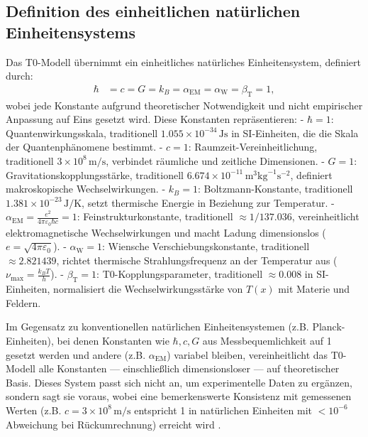 \documentclass[12pt,a4paper]{article}
\newcommand{\Tfield}{T(x)}
\newcommand{\alphaEM}{\alpha_{\text{EM}}}
\newcommand{\alphaW}{\alpha_{\text{W}}}
\newcommand{\betaT}{\beta_{\text{T}}}
\begin{document}
	\subsection{Definition des einheitlichen natürlichen Einheitensystems}
	\label{subsec:unified_system}
	
	Das T0-Modell übernimmt ein einheitliches natürliches Einheitensystem, definiert durch:
	\begin{align}
		\hbar &= c = G = k_B = \alphaEM = \alphaW = \betaT = 1,
		\label{eq:unit_system}
	\end{align}
	wobei jede Konstante aufgrund theoretischer Notwendigkeit und nicht empirischer Anpassung auf Eins gesetzt wird. Diese Konstanten repräsentieren:
	- \(\hbar = 1\): Quantenwirkungsskala, traditionell \(1.055 \times 10^{-34} \, \text{Js}\) in SI-Einheiten, die die Skala der Quantenphänomene bestimmt.
	- \(c = 1\): Raumzeit-Vereinheitlichung, traditionell \(3 \times 10^8 \, \text{m/s}\), verbindet räumliche und zeitliche Dimensionen.
	- \(G = 1\): Gravitationskopplungsstärke, traditionell \(6.674 \times 10^{-11} \, \text{m}^3\text{kg}^{-1}\text{s}^{-2}\), definiert makroskopische Wechselwirkungen.
	- \(k_B = 1\): Boltzmann-Konstante, traditionell \(1.381 \times 10^{-23} \, \text{J/K}\), setzt thermische Energie in Beziehung zur Temperatur.
	- \(\alphaEM = \frac{e^2}{4\pi\varepsilon_0\hbar c} = 1\): Feinstrukturkonstante, traditionell \(\approx 1/137.036\), vereinheitlicht elektromagnetische Wechselwirkungen und macht Ladung dimensionslos (\(e = \sqrt{4\pi\varepsilon_0}\)).
	- \(\alphaW = 1\): Wiensche Verschiebungskonstante, traditionell \(\approx 2.821439\), richtet thermische Strahlungsfrequenz an der Temperatur aus (\(\nu_{\text{max}} = \frac{k_B T}{h}\)).
	- \(\betaT = 1\): T0-Kopplungsparameter, traditionell \(\approx 0.008\) in SI-Einheiten, normalisiert die Wechselwirkungsstärke von \(\Tfield\) mit Materie und Feldern.
	
	Im Gegensatz zu konventionellen natürlichen Einheitensystemen (z.B. Planck-Einheiten), bei denen Konstanten wie \(\hbar, c, G\) aus Messbequemlichkeit auf 1 gesetzt werden und andere (z.B. \(\alphaEM\)) variabel bleiben, vereinheitlicht das T0-Modell alle Konstanten — einschließlich dimensionsloser — auf theoretischer Basis. Dieses System passt sich nicht an, um experimentelle Daten zu ergänzen, sondern sagt sie voraus, wobei eine bemerkenswerte Konsistenz mit gemessenen Werten (z.B. \(c = 3 \times 10^8 \, \text{m/s}\) entspricht 1 in natürlichen Einheiten mit \(< 10^{-6}\) Abweichung bei Rückumrechnung) erreicht wird \cite{pascher_alphabeta_2025}.
	
\end{document}
